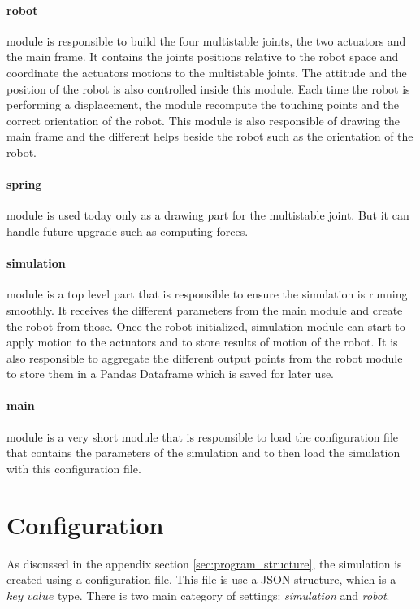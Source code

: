         \paragraph{robot}
            module is responsible to build the four multistable joints, the two actuators and the main frame. It contains the joints positions relative to the robot space and coordinate the actuators motions to the multistable joints. The attitude and the position of the robot is also controlled inside this module. Each time the robot is performing a displacement, the module recompute the touching points and the correct orientation of the robot. This module is also responsible of drawing the main frame and the different helps beside the robot such as the orientation of the robot.
        \paragraph{spring}
            module is used today only as a drawing part for the multistable joint. But it can handle future upgrade such as computing forces. 
        \paragraph{simulation}
            module is a top level part that is responsible to ensure the simulation is running smoothly. It receives the different parameters from the main module and create the robot from those. Once the robot initialized, simulation module can start to apply motion to the actuators and to store results of motion of the robot. It is also responsible to aggregate the different output points from the robot module to store them in a Pandas Dataframe which is saved for later use. 
        \paragraph{main}
            module is a very short module that is responsible to load the configuration file that contains the parameters of the simulation and to then load the simulation with this configuration file. 
    \section{Configuration}\label{sec:config}
        As discussed in the appendix section \ref{sec:program_structure}, the simulation is created using a configuration file. This file is use a JSON structure, which is a $key$ $value$ type. There is two main category of settings: \textit{simulation} and \textit{robot}. 
        
